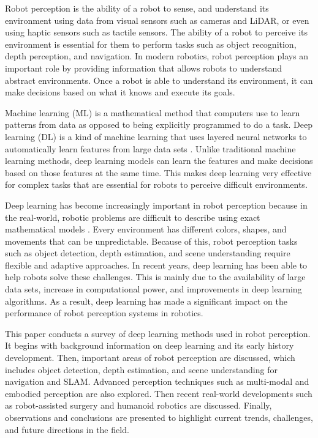 \documentclass[conference]{IEEEtran}
\begin{document}
Robot perception is the ability of a robot to sense, and understand its environment using data from visual sensors such as cameras and LiDAR, or even using haptic sensors such as tactile sensors. The ability of a robot to perceive its environment is essential for them to perform tasks such as object recognition, depth perception, and navigation. In modern robotics, robot perception plays an important role by providing information that allows robots to understand abstract environments. Once a robot is able to understand its environment, it can make decisions based on what it knows and execute its goals.
\par
Machine learning (ML) is a mathematical method that computers use to learn patterns from data as opposed to being explicitly programmed to do a task. Deep learning (DL) is a kind of machine learning that uses layered neural networks to automatically learn features from large data sets \cite{karoly2020}. Unlike traditional machine learning methods, deep learning models can learn the features and make decisions based on those features at the same time. This makes deep learning very effective for complex tasks that are essential for robots to perceive difficult environments.
\par
Deep learning has become increasingly important in robot perception because in the real-world, robotic problems are difficult to describe using exact mathematical models \cite{karoly2020}. Every environment has different colors, shapes, and movements that can be unpredictable. Because of this, robot perception tasks such as object detection, depth estimation, and scene understanding require flexible and adaptive approaches. In recent years, deep learning has been able to help robots solve these challenges. This is mainly due to the availability of large data sets, increase in computational power, and improvements in deep learning algorithms. As a result, deep learning has made a significant impact on the performance of robot perception systems in robotics.
\par
This paper conducts a survey of deep learning methods used in robot perception. It begins with background information on deep learning and its early history development. Then, important areas of robot perception are discussed, which includes object detection, depth estimation, and scene understanding for navigation and SLAM. Advanced perception techniques such as multi-modal and embodied perception are also explored. Then recent real-world developments such as robot-assisted surgery and humanoid robotics are discussed. Finally, observations and conclusions are presented to highlight current trends, challenges, and future directions in the field.
\end{document}
